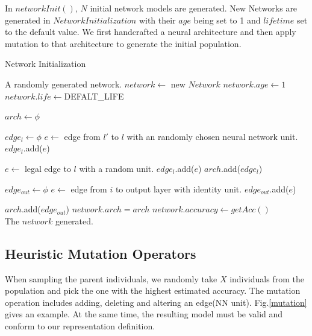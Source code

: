\documentclass[conference]{IEEEtran}
\begin{document}
In $networkInit()$, $N$ initial network models are generated. New Networks are generated in $Network Initialization$ with their $age $ being set to 1 and $lifetime$ set to the default value. We first handcrafted a neural architecture and then apply mutation to that architecture to generate the initial population. 

\begin{algorithm}[H]  
  \caption{ Network Initialization}
  
  
  \begin{algorithmic}[1]  
      \Ensure A randomly generated network.
  \State $network\gets $ new $Network$
  \State $network.age\gets1$
  \State $network.life\gets $DEFALT\_LIFE 
  
  \State $arch\gets \phi$

  \State $edge_l \gets \phi$
  \State $e \gets$ edge from $l'$ to $l$ with an randomly chosen neural network unit.
  \State $edge_l$.add($e$)
  \EndIf
      \EndFor

      \State  $e \gets$ legal edge to $l$ with a random unit.
      \State $edge_l$.add($e$)
      \EndIf
  \State $arch$.add($edge_l$)
      \EndFor
  
  \State $edge_{out} \gets \phi$
    \State $e \gets$ edge from $i$ to output layer with identity unit.
    \State $edge_{out}$.add($e$)
  \EndFor

  \State $arch$.add($edge_{out}$)
  \State $network.arch=arch$
  \State $network.accuracy\gets getAcc()$
  \\
      \Return The $network$ generated.
      
  \end{algorithmic}  
\end{algorithm}  

\subsection{Heuristic Mutation Operators}
When sampling the parent individuals, we randomly take $X$ individuals from the population and pick the one with the highest estimated accuracy. The mutation operation includes adding, deleting and altering an edge(NN unit). Fig.\ref{mutation} gives an example. At the same time, the resulting model must be valid and conform to our representation definition. 
\end{document}
